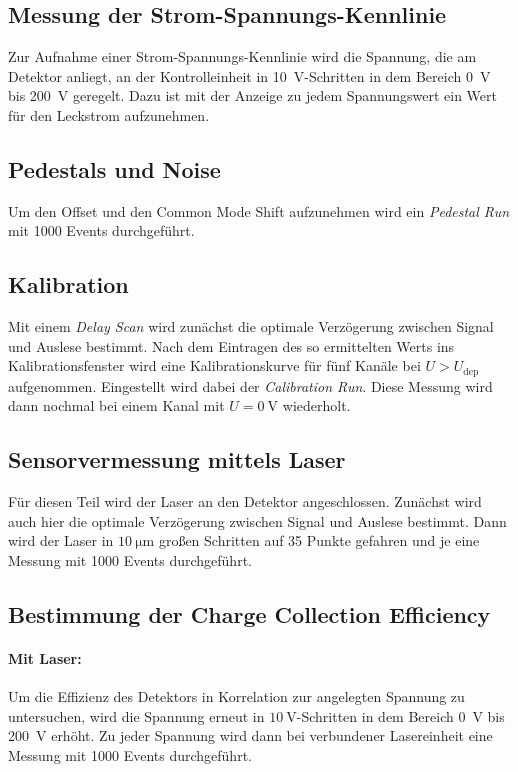 \subsection{Messung der Strom-Spannungs-Kennlinie}
Zur Aufnahme einer Strom-Spannungs-Kennlinie wird die Spannung, die am Detektor anliegt, an der Kontrolleinheit in \SI{10}{\volt}-Schritten in dem Bereich \SI{0}{\volt} bis \SI{200}{\volt} geregelt. Dazu ist mit der Anzeige zu jedem Spannungswert ein Wert für den Leckstrom aufzunehmen.

\subsection{Pedestals und Noise}
Um den Offset und den Common Mode Shift aufzunehmen wird ein \textit{Pedestal Run} mit 1000 Events durchgeführt.

\subsection{Kalibration}
Mit einem \textit{Delay Scan} wird zunächst die optimale Verzögerung zwischen Signal und Auslese bestimmt. Nach dem Eintragen des so ermittelten Werts ins Kalibrationsfenster wird eine Kalibrationskurve für fünf Kanäle bei $U > U_\text{dep}$ aufgenommen. Eingestellt wird dabei der \textit{Calibration Run}. Diese Messung wird dann nochmal bei einem Kanal mit $U=\SI{0}{\volt}$ wiederholt.

\subsection{Sensorvermessung mittels Laser}
Für diesen Teil wird der Laser an den Detektor angeschlossen.
Zunächst wird auch hier die optimale Verzögerung zwischen Signal und Auslese bestimmt.
Dann wird der Laser in $\SI{10}{\micro\meter}$ großen Schritten auf 35 Punkte gefahren und je eine Messung mit 1000 Events durchgeführt.

\subsection{Bestimmung der Charge Collection Efficiency}
\paragraph{Mit Laser:}
Um die Effizienz des Detektors in Korrelation zur angelegten Spannung zu untersuchen, wird die Spannung erneut in $\SI{10}{\volt}$-Schritten in dem Bereich \SI{0}{\volt} bis \SI{200}{\volt} erhöht. Zu jeder Spannung wird dann bei verbundener Lasereinheit eine Messung mit 1000 Events durchgeführt.
